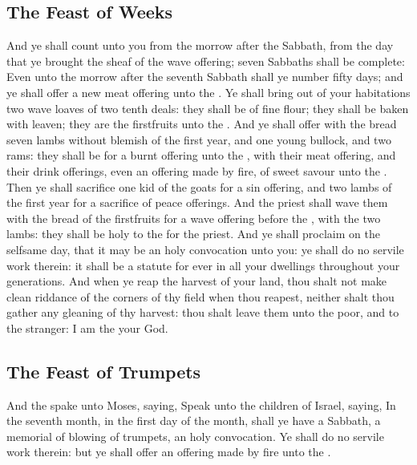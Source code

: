 \begin{biblechapter}
\subsection*{The Feast of Weeks}
\verse And ye shall count unto you from the morrow after the Sabbath, from the day that ye brought the sheaf of the wave offering; seven Sabbaths shall be complete:
\verse Even unto the morrow after the seventh Sabbath shall ye number fifty days; and ye shall offer a new meat offering unto the \LORD.
\verse Ye shall bring out of your habitations two wave loaves of two tenth deals: they shall be of fine flour; they shall be baken with leaven; they are the firstfruits unto the \LORD.
\verse And ye shall offer with the bread seven lambs without blemish of the first year, and one young bullock, and two rams: they shall be for a burnt offering unto the \LORD, with their meat offering, and their drink offerings, even an offering made by fire, of sweet savour unto the \LORD.
\verse Then ye shall sacrifice one kid of the goats for a sin offering, and two lambs of the first year for a sacrifice of peace offerings.
\verse And the priest shall wave them with the bread of the firstfruits for a wave offering before the \LORD, with the two lambs: they shall be holy to the \LORD for the priest.
\verse And ye shall proclaim on the selfsame day, that it may be an holy convocation unto you: ye shall do no servile work therein: it shall be a statute for ever in all your dwellings throughout your generations.
\verse And when ye reap the harvest of your land, thou shalt not make clean riddance of the corners of thy field when thou reapest, neither shalt thou gather any gleaning of thy harvest: thou shalt leave them unto the poor, and to the stranger: I am the \LORD your God.
\subsection*{The Feast of Trumpets}
\verse And the \LORD spake unto Moses, saying,
\verse Speak unto the children of Israel, saying, In the seventh month, in the first day of the month, shall ye have a Sabbath, a memorial of blowing of trumpets, an holy convocation.
\verse Ye shall do no servile work therein: but ye shall offer an offering made by fire unto the \LORD.

\end{biblechapter}
